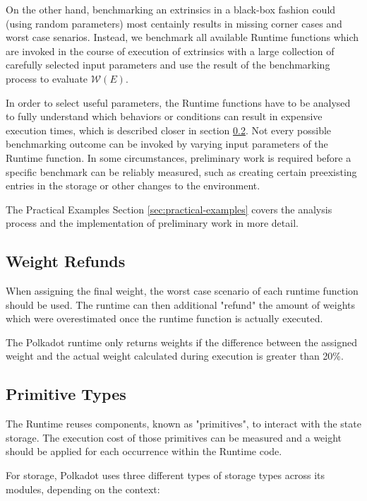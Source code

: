 \documentclass[11pt,a4paper]{article}
\newcommand{\TWF}{\ensuremath{\mathcal{W}}}
\begin{document}
On the other hand, benchmarking an extrinsics in a black-box fashion could
(using random parameters) most centainly results in missing corner cases and
worst case senarios. Instead, we benchmark all available Runtime functions which
are invoked in the course of execution of extrinsics with a large collection of
carefully selected input parameters and use the result of the benchmarking
process to evaluate $\TWF(E)$.
\newline

In order to select useful parameters, the Runtime functions have to be analysed
to fully understand which behaviors or conditions can result in expensive
execution times, which is described closer in section
\ref{sect:primitive-types}. Not every possible benchmarking outcome can be
invoked by varying input parameters of the Runtime function. In some
circumstances, preliminary work is required before a specific benchmark can be
reliably measured, such as creating certain preexisting entries in the storage
or other changes to the environment.
\newline

The Practical Examples Section \ref{sec:practical-examples} covers the analysis
process and the implementation of preliminary work in more detail.

\subsection{Weight Refunds}
When assigning the final weight, the worst case scenario of each runtime
function should be used. The runtime can then additional "refund" the amount of
weights which were overestimated once the runtime function is actually executed.
\newline

The Polkadot runtime only returns weights if the difference between the assigned
weight and the actual weight calculated during execution is greater than 20\%.

\subsection{Primitive Types}\label{sect:primitive-types}
The Runtime reuses components, known as "primitives", to interact with the state
storage. The execution cost of those primitives can be measured and a weight
should be applied for each occurrence within the Runtime code.
\newline

For storage, Polkadot uses three different types of storage types across its
modules, depending on the context:
\end{document}
